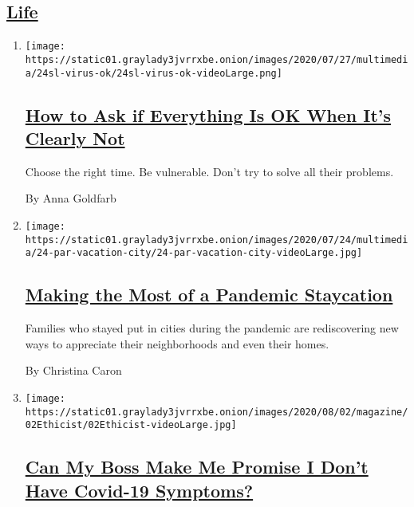 \hypertarget{life}{%
\subsection{\texorpdfstring{\protect\hyperlink{}{Life}}{Life}}\label{life}}

\begin{enumerate}
\def\labelenumi{\arabic{enumi}.}
\item
  \texttt{[image: https://static01.graylady3jvrrxbe.onion/images/2020/07/27/multimedia/24sl-virus-ok/24sl-virus-ok-videoLarge.png]}

  \hypertarget{how-to-ask-if-everything-is-ok-when-its-clearly-not}{%
  \subsection{\texorpdfstring{\href{/2020/07/28/smarter-living/coronavirus-how-to-check-in-with-a-friend.html}{How
  to Ask if Everything Is OK When It's Clearly
  Not}}{How to Ask if Everything Is OK When It's Clearly Not}}\label{how-to-ask-if-everything-is-ok-when-its-clearly-not}}

  Choose the right time. Be vulnerable. Don't try to solve all their
  problems.

  By Anna Goldfarb
\item
  \texttt{[image: https://static01.graylady3jvrrxbe.onion/images/2020/07/24/multimedia/24-par-vacation-city/24-par-vacation-city-videoLarge.jpg]}

  \hypertarget{making-the-most-of-a-pandemic-staycation}{%
  \subsection{\texorpdfstring{\href{/2020/07/24/parenting/summer-staycation-coronavirus.html}{Making
  the Most of a Pandemic
  Staycation}}{Making the Most of a Pandemic Staycation}}\label{making-the-most-of-a-pandemic-staycation}}

  Families who stayed put in cities during the pandemic are
  rediscovering new ways to appreciate their neighborhoods and even
  their homes.

  By Christina Caron
\item
  \texttt{[image: https://static01.graylady3jvrrxbe.onion/images/2020/08/02/magazine/02Ethicist/02Ethicist-videoLarge.jpg]}

  \hypertarget{can-my-boss-make-me-promise-i-dont-have-covid-19-symptoms}{%
  \subsection{\texorpdfstring{\href{/2020/07/28/magazine/can-my-boss-make-me-promise-i-dont-have-covid-19-symptoms.html}{Can
  My Boss Make Me Promise I Don't Have Covid-19
  Symptoms?}}{Can My Boss Make Me Promise I Don't Have Covid-19 Symptoms?}}\label{can-my-boss-make-me-promise-i-dont-have-covid-19-symptoms}}


\end{enumerate}
